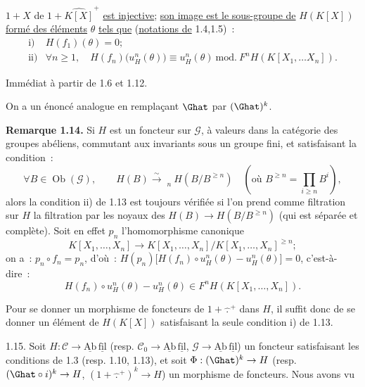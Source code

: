 
\(1+X\) de \(1+\widehat{K[X]}^+\) \uline{est injective}; \uline{son image est le sous-groupe de} \(H(K[X])\) \uline{formé des éléments} \(\theta\) \uline{tels que} (\uline{notations de} 1.4,1.5)~:
\[
\begin{array}{ll}
\text{i)}& H(f_1)(\theta)=0;\\[0.3em]
\text{ii)}& \forall n\geq1,\quad
H(f_n)\bigl(u_H^n(\theta)\bigr)\equiv u_H^n(\theta)
\ \mathrm{mod.}\ F^nH(K[X_1,\ldots X_n]).
\end{array}
\]

Immédiat à partir de 1.6 et 1.12.

On a un énoncé analogue en remplaçant \(\Ghat\) par \((\Ghat)^k\).

\textbf{Remarque 1.14.} Si \(H\) est un foncteur sur \(\mathcal G\), à valeurs dans la catégorie des groupes abéliens, commutant aux invariants sous un groupe fini, et satisfaisant la condition~:
\[
  \forall B\in\operatorname{Ob}(\mathcal G),\qquad
  H(B)\xrightarrow{\sim}\mathop{\underleftarrow{\mathrm{Lim}}}\limits_n H(B/B^{\geq n})\quad(\text{où }B^{\geq n}=\prod_{i\geq n}B^i),
\]
alors la condition ii) de 1.13 est toujours vérifiée si l'on prend comme filtration sur \(H\) la filtration par les noyaux des \(H(B)\longrightarrow H(B/B^{\geq n})\) (qui est séparée et complète). Soit en effet \(p_n\) l'homomorphisme canonique
\[
  K[X_1,\ldots,X_n]\longrightarrow K[X_1,\ldots,X_n]/K[X_1,\ldots,X_n]^{\geq n};
\]
on a~: \(p_n\circ f_n=p_n\), d'où~: \(H(p_n)\bigl[H(f_n)\circ u_H^n(\theta)-u_H^n(\theta)\bigr]=0\), c'est-à-dire~:
\[
  H(f_n)\circ u_H^n(\theta)-u_H^n(\theta)
  \in F^nH(K[X_1,\ldots,X_n]).
\]

Pour se donner un morphisme de foncteurs de \(1+\widehat{\,\mathord{.}\,}^{+}\) dans \(H\), il suffit donc de se donner un élément de \(H(K[X])\) satisfaisant la seule condition i) de 1.13.

1.15. Soit \(H:\mathcal C\to\underline{\mathrm{Ab}}\,\underline{\mathrm{fil}}\) (resp. \(\mathcal C_0\to\underline{\mathrm{Ab}}\,\underline{\mathrm{fil}}\), \(\mathcal G\to\underline{\mathrm{Ab}}\,\underline{\mathrm{fil}}\)) un foncteur satisfaisant les conditions de 1.3 (resp. 1.10, 1.13), et soit \(\Phi:(\Ghat)^k\to H\) (resp. \((\Ghat\circ i)^k\to H\), \((1+\widehat{\,\mathord{.}\,}^{+})^k\to H\)) un morphisme de foncteurs. Nous avons vu 
